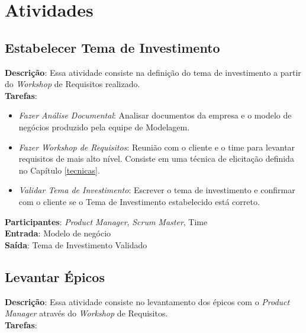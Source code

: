 \section{Atividades}

\subsection{Estabelecer Tema de Investimento}

  \textbf{Descrição}: Essa atividade consiste na definição do tema de investimento a partir do \textit{Workshop} de Requisitos realizado.\\

  \textbf{Tarefas}:

  \begin{itemize}
  
    \item \indent \textit{Fazer Análise Documental}: Analisar documentos da empresa e o modelo de negócios produzido pela equipe de Modelagem.
   
   \item \indent \textit{Fazer Workshop de Requisitos}: Reunião com o cliente e o time para levantar requisitos de mais alto nível. Consiste
   em uma técnica de elicitação definida no Capítulo \ref{tecnicas}.

   \item \indent \textit{Validar Tema de Investimento}: Escrever o tema de investimento e confirmar com o cliente se
   o Tema de Investimento estabelecido está correto.
  \end{itemize}

  \textbf{Participantes}: \textit{Product Manager}, \textit{Scrum Master}, Time \\

  \textbf{Entrada}: Modelo de negócio \\

  \textbf{Saída}: Tema de Investimento Validado\\

\subsection{Levantar Épicos}
  \textbf{Descrição}: Essa atividade consiste no levantamento dos épicos com o \textit{Product Manager} através do  \textit{Workshop} de Requisitos. \\

  \textbf{Tarefas}:

